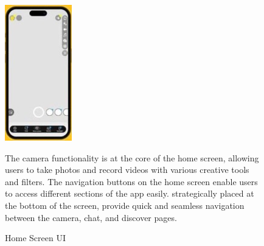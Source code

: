 \documentclass{article}
\begin{document}
\begin{figure}[h]
    \begin{minipage}{0.15\textwidth} 
        \includegraphics[width=\linewidth]{Home.jpg} 
        \caption{Home Screen UI}
        \label{fig:homescreen}
    \end{minipage}
    \begin{minipage}{0.80\textwidth} 
        The camera functionality is at the core of the home screen, allowing users to take photos and record videos with various creative tools and filters. The navigation buttons on the home screen enable users to access different sections of the app easily. strategically placed at the bottom of the screen, provide quick and seamless navigation between the camera, chat, and discover pages.\newline
    \end{minipage}
\end{figure}
\end{document}
